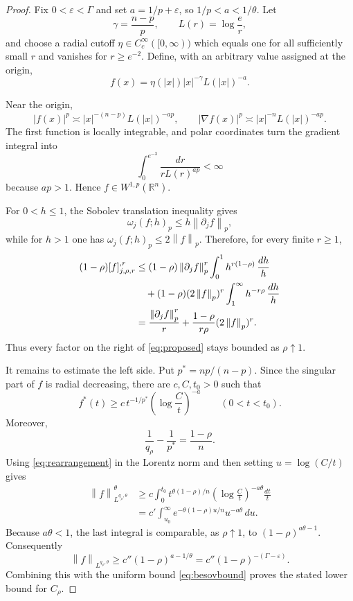 \documentclass[11pt]{article}
\newcommand{\R}{\mathbb R}
\newcommand{\Nrm}[1]{\left\lVert #1\right\rVert}
\begin{document}
\begin{proof}
Fix $0<\varepsilon<\Gamma$ and set $a=1/p+\varepsilon$, so
$1/p<a<1/\theta$.  Let
\[
 \gamma=\frac{n-p}{p},\qquad L(r)=\log\frac er,
\]
and choose a radial cutoff $\eta\in C_c^\infty([0,\infty))$ which equals one
for all sufficiently small $r$ and vanishes for $r\ge e^{-2}$.  Define, with
an arbitrary value assigned at the origin,
\begin{equation}\label{eq:witness}
 f(x)=\eta(|x|)|x|^{-\gamma}L(|x|)^{-a}.
\end{equation}

Near the origin,
\[
 |f(x)|^p\asymp |x|^{-(n-p)}L(|x|)^{-ap},
 \qquad
 |\nabla f(x)|^p\asymp |x|^{-n}L(|x|)^{-ap}.
\]
The first function is locally integrable, and polar coordinates turn the
gradient integral into
\[
 \int_0^{e^{-3}}\frac{dr}{rL(r)^{ap}}<\infty
\]
because $ap>1$.  Hence $f\in W^{1,p}(\R^n)$.

For $0<h\le1$, the Sobolev translation inequality gives
\[
 \omega_j(f;h)_p\le h\Nrm{\partial_j f}_p,
\]
while for $h>1$ one has $\omega_j(f;h)_p\le2\Nrm f_p$.  Therefore, for
every finite $r\ge1$,
\begin{align}\label{eq:besovbound}
 (1-\rho)[f]_{j,\rho,r}^{,r}
 &\le (1-\rho)\Nrm{\partial_j f}_p^r
       \int_0^1h^{r(1-\rho)}\,\frac{dh}{h}
 \notag\\
 &\quad +(1-\rho)(2\Nrm f_p)^r
       \int_1^\infty h^{-r\rho}\,\frac{dh}{h}\\
 &=\frac{\Nrm{\partial_j f}_p^r}{r}
   +\frac{1-\rho}{r\rho}(2\Nrm f_p)^r.
\end{align}
Thus every factor on the right of \eqref{eq:proposed} stays bounded as
$\rho\uparrow1$.

It remains to estimate the left side.  Put $p^*=np/(n-p)$.  Since the
singular part of $f$ is radial decreasing, there are $c,C,t_0>0$ such that
\begin{equation}\label{eq:rearrangement}
 f^*(t)\ge c\,t^{-1/p^*}\left(\log\frac Ct\right)^{-a}
 \qquad(0<t<t_0).
\end{equation}
Moreover,
\[
 \frac1{q_\rho}-\frac1{p^*}=\frac{1-\rho}{n}.
\]
Using \eqref{eq:rearrangement} in the Lorentz norm and then setting
$u=\log(C/t)$ gives
\begin{align*}
 \Nrm f_{L^{q_\rho,\theta}}^\theta
 &\ge c\int_0^{t_0}
 t^{\theta(1-\rho)/n}
 \left(\log\frac Ct\right)^{-a\theta}\frac{dt}{t}\\
 &=c'\int_{u_0}^{\infty}
 e^{-\theta(1-\rho)u/n}u^{-a\theta}\,du.
\end{align*}
Because $a\theta<1$, the last integral is comparable, as $\rho\uparrow1$,
to $(1-\rho)^{a\theta-1}$.  Consequently
\[
 \Nrm f_{L^{q_\rho,\theta}}
 \ge c''(1-\rho)^{a-1/\theta}
 =c''(1-\rho)^{-(\Gamma-\varepsilon)}.
\]
Combining this with the uniform bound \eqref{eq:besovbound} proves the stated
lower bound for $C_\rho$.
\end{proof}
\end{document}
